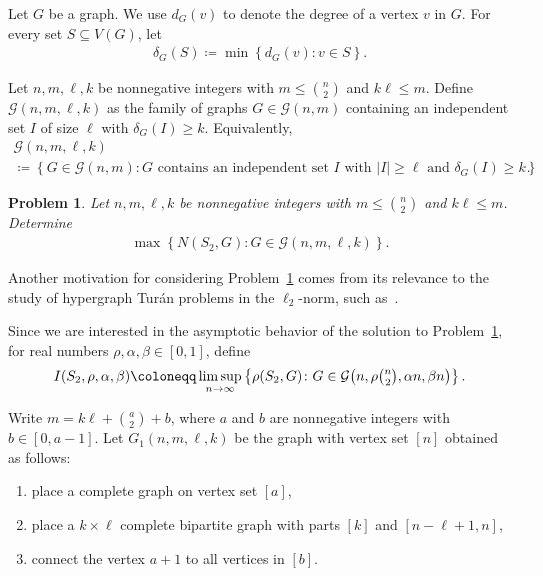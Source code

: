 \documentclass[11pt,a4paper]{article}
\newtheorem{problem}[definition]{Problem}
\begin{document}
Let $G$ be a graph. 
We use $d_{G}(v)$ to denote the degree of a vertex $v$ in $G$. 
For every set $S \subseteq V(G)$, let
\begin{align*}
    \delta_{G}(S)
    \coloneqq \min\left\{ d_{G}(v) \colon v \in S \right\}. 
\end{align*}

Let $n, m, \ell, k$ be nonnegative integers with $m \le \binom{n}{2}$ and $k \ell \le m$. 
Define $\mathcal{G}(n,m,\ell, k)$ as the family of graphs $G \in \mathcal{G}(n,m)$ containing an independent set $I$ of size $\ell$ with $\delta_{G}(I) \ge k$. 
Equivalently, 
\begin{multline*}
    \mathcal{G}(n,m,\ell, k) \\
    \coloneqq \left\{ G \in \mathcal{G}(n,m) \colon \text{$G$ contains an independent set $I$ with $|I| \ge \ell$ and $\delta_{G}(I) \ge k$}\right\}.
\end{multline*}

\begin{problem}\label{Problem:this-note-counting-star}
    Let $n, m, \ell, k$ be nonnegative integers with $m \le \binom{n}{2}$ and $k \ell \le m$.  Determine 
    \begin{align*}
        \max\left\{ N(S_2, G) \colon G \in \mathcal{G}(n,m,\ell, k) \right\}. 
    \end{align*}
\end{problem}
Another motivation for considering Problem~\ref{Problem:this-note-counting-star} comes from its relevance to the study of hypergraph Tur\'{a}n problems in the $\ell_2$-norm, such as~\cite{HLZ25Fano}. 

Since we are interested in the asymptotic behavior of the solution to Problem~\ref{Problem:this-note-counting-star},  for real numbers $\rho, \alpha, \beta \in [0,1]$, define 
\begin{align*}
    I(S_2, \rho, \alpha, \beta)
    \coloneqq \limsup_{n \to \infty} \left\{ \rho(S_2, G) \colon G \in \mathcal{G}\big(n,\rho \tbinom{n}{2}, \alpha n, \beta n \big) \right\}. 
\end{align*}
%

Write $m = k \ell + \binom{a}{2} + b$, where $a$ and $b$ are nonnegative integers with $b \in [0, a-1]$. 
Let $G_{1}(n,m,\ell, k)$ be the graph with vertex set $[n]$ obtained as follows: 
\begin{enumerate}[label=(\roman*)]
    \item place a complete graph on vertex set $[a]$, 
    \item place a $k \times \ell$ complete bipartite graph with parts $[k]$ and $[n-\ell+1, n]$, 
    \item connect the vertex $a+1$ to all vertices in $[b]$. 
\end{enumerate}
\end{document}
